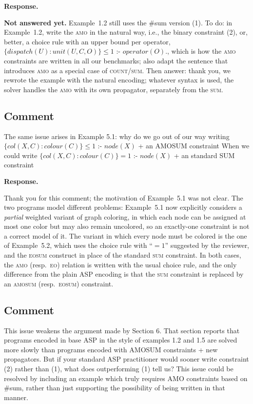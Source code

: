 \documentclass[11pt]{article}
\theoremstyle{definition}
\newcommand{\revieweranswered}{\subsection{Comment}}
\newenvironment{response}{
    \color{blue} \textbf{Response.}
}{
}
\newcommand{\notanswered}[1]{{\color{red}\textbf{Not answered yet.} #1}}
\begin{document}
\begin{response}
\notanswered{Example~1.2 still uses the \#sum version (1).
To do: in Example~1.2, write the \textsc{amo} in the natural way, i.e., the binary constraint (2), or, better, a choice rule with an upper bound per operator,
$\{\mathit{dispatch}(U) : \mathit{unit}(U,C,O)\} \le 1 \text{ :- } \mathit{operator}(O).$,
which is how the \textsc{amo} constraints are written in all our benchmarks; also adapt the sentence that introduces \textsc{amo} as a special case of \textsc{count}/\textsc{sum}.
Then answer: thank you, we rewrote the example with the natural encoding; whatever syntax is used, the solver handles the \textsc{amo} with its own propagator, separately from the \textsc{sum}.}
\end{response}

\vspace{0.5cm}
\revieweranswered
The same issue arises in Example 5.1: why do we go out of our way writing
$\{ \mathit{col}(X,C) : \mathit{colour}(C) \} \le 1 \text{ :- } \mathit{node}(X)$ + an AMOSUM constraint
When we could write
$\{ \mathit{col}(X,C) : \mathit{colour}(C) \} = 1 \text{ :- } \mathit{node}(X)$ + an standard SUM constraint

\begin{response}
Thank you for this comment; the motivation of Example~5.1 was not clear.
The two programs model different problems: Example~5.1 now explicitly considers a \emph{partial} weighted variant of graph coloring, in which each node can be assigned at most one color but may also remain uncolored, so an exactly-one constraint is not a correct model of it.
The variant in which every node must be colored is the one of Example~5.2, which uses the choice rule with ``$= 1$'' suggested by the reviewer, and the \textsc{eosum} construct in place of the standard \textsc{sum} constraint.
In both cases, the \textsc{amo} (resp.\ \textsc{eo}) relation is written with the usual choice rule, and the only difference from the plain ASP encoding is that the \textsc{sum} constraint is replaced by an \textsc{amosum} (resp.\ \textsc{eosum}) constraint.
\end{response}

\vspace{0.5cm}
\revieweranswered
This issue weakens the argument made by Section 6. That section reports that programs encoded in base ASP in the style of examples 1.2 and 1.5 are solved more slowly than programs encoded with AMOSUM constraints + new propagators. But if your standard ASP practitioner would sooner write constraint (2) rather than (1), what does outperforming (1) tell us? This issue could be resolved by including an example which truly requires AMO constraints based on \#sum, rather than just supporting the possibility of being written in that manner.
\end{document}
